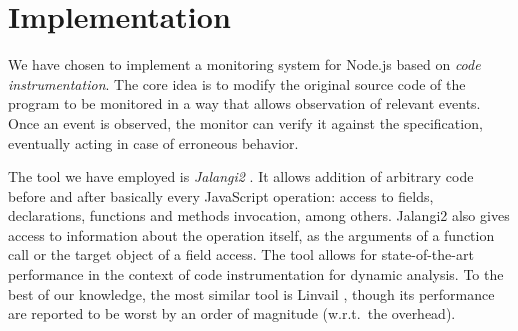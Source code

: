 \section{Implementation}
\label{sec:impl}
We have chosen to implement a monitoring system for Node.js based on \emph{code instrumentation}.
The core idea is to modify the original source code of the program to be monitored in a way that allows observation of relevant events.
Once an event is observed, the monitor can verify it against the specification, eventually acting in case of erroneous behavior.

The tool we have employed is \emph{Jalangi2} \cite{jalangi}.
It allows addition of arbitrary code before and after basically every JavaScript operation: access to fields, declarations, functions and methods invocation, among others. Jalangi2 also gives access to information about the operation itself, as the arguments of a function call or the target object of a field access.
The tool allows for state-of-the-art performance in the context of code instrumentation for dynamic analysis.
To the best of our knowledge, the most similar tool is Linvail \cite{linvail}, though its performance are reported to be worst by an order of magnitude (w.r.t.\ the overhead).

